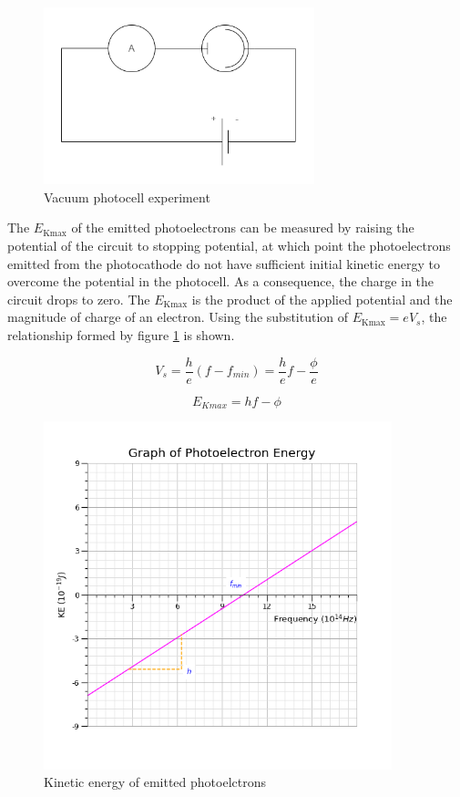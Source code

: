 \documentclass[10pt]{article}
\begin{document}
\begin{figure}[H]
\centering
\includegraphics[width=0.7\textwidth,keepaspectratio]{./images/photoelectric_effect_circuit.png}
\caption{Vacuum photocell experiment}
\end{figure}

The \(E_{\text{Kmax}}\) of the emitted photoelectrons can be measured by raising the potential of the circuit to stopping potential, at which point the photoelectrons emitted from the photocathode do not have sufficient initial kinetic energy to overcome the potential in the photocell. As a consequence, the charge in the circuit drops to zero. The \(E_{\text{Kmax}}\) is the product of the applied potential and the magnitude of charge of an electron. Using the substitution of \(E_{\text{Kmax}} = eV_s\), the relationship formed by figure \ref{img:photoelectric_graph} is shown.

\[V_s = \dfrac{h}{e}(f - f_{min}) = \dfrac{h}{e}f - \dfrac{\phi}{e}\]

\[E_{Kmax} = hf - \phi\]

\begin{figure}[H]
\centering
\includegraphics[width=0.9\textwidth,keepaspectratio]{./images/photoelectron_energy.png}
\caption{Kinetic energy of emitted photoelctrons}
\label{img:photoelectric_graph}
\end{figure}
\end{document}
